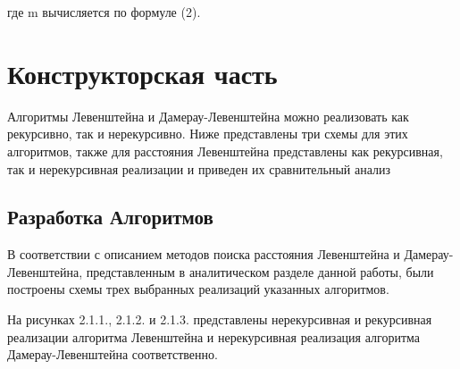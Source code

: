 \documentclass{article}
\begin{document}
где m вычисляется по формуле (2).

\newpage
\section{Конструкторская часть}
\label{sec:construct}

Алгоритмы Левенштейна и Дамерау-Левенштейна можно реализовать как рекурсивно, так и нерекурсивно. Ниже представлены три схемы для этих алгоритмов, также для расстояния Левенштейна представлены как рекурсивная, так и нерекурсивная реализации и приведен их сравнительный анализ

\subsection{Разработка Алгоритмов}
\label{sec:analitics:alg}

В соответствии с описанием методов поиска расстояния Левенштейна и Дамерау-Левенштейна, представленным в аналитическом разделе данной работы, были построены схемы трех выбранных реализаций указанных алгоритмов.

На рисунках 2.1.1., 2.1.2. и 2.1.3. представлены нерекурсивная и рекурсивная реализации алгоритма Левенштейна и нерекурсивная реализация алгоритма Дамерау-Левенштейна соответственно.
\end{document}
